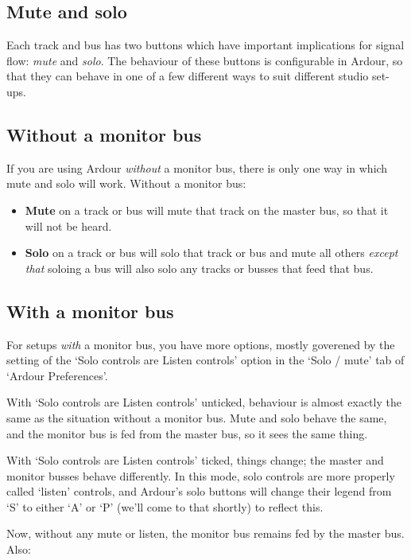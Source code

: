 \documentclass[10pt,a4paper]{book}
\begin{document}
{\subsection{Mute and solo}

Each track and bus has two buttons which have important implications
for signal flow: \emph{mute} and \emph{solo}.  The behaviour of these
buttons is configurable in Ardour, so that they can behave in one of a
few different ways to suit different studio set-ups.


\subsection{Without a monitor bus}

If you are using Ardour \emph{without} a monitor bus, there is only
one way in which mute and solo will work.  Without a monitor bus:

\begin{itemize}
\item \textbf{Mute} on a track or bus will mute that track on the
  master bus, so that it will not be heard.
\item \textbf{Solo} on a track or bus will solo that track or bus and
  mute all others \emph{except that} soloing a bus will also solo any
  tracks or busses that feed that bus.
\end{itemize}


\subsection{With a monitor bus}

For setups \emph{with} a monitor bus, you have more options, mostly
goverened by the setting of the `Solo controls are Listen controls'
option in the `Solo / mute' tab of `Ardour Preferences'.

With `Solo controls are Listen controls' unticked, behaviour is almost
exactly the same as the situation without a monitor bus.  Mute and
solo behave the same, and the monitor bus is fed from the master bus,
so it sees the same thing.

With `Solo controls are Listen controls' ticked, things change; the
master and monitor busses behave differently.  In this mode, solo
controls are more properly called `listen' controls, and Ardour's solo
buttons will change their legend from `S' to either `A' or `P' (we'll
come to that shortly) to reflect this.

Now, without any mute or listen, the monitor bus remains fed by the
master bus.  Also:

}
\end{document}
